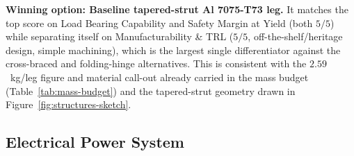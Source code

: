 \documentclass[11pt]{article}
\begin{document}
\begin{table}[H]
\centering
\small
{}
\caption{Landing leg structure trade study.}
\label{tab:structures-trade}
\end{table}

\textbf{Winning option: Baseline tapered-strut Al 7075-T73 leg.} It matches the top
score on Load Bearing Capability and Safety Margin at Yield (both $5/5$) while separating itself
on Manufacturability \& TRL ($5/5$, off-the-shelf/heritage design, simple machining), which is
the largest single differentiator against the cross-braced and folding-hinge alternatives. This
is consistent with the $2.59$~kg/leg figure and material call-out already carried in the mass
budget (Table~\ref{tab:mass-budget}) and the tapered-strut geometry drawn in
Figure~\ref{fig:structures-sketch}.

\subsection{Electrical Power System}
\end{document}
